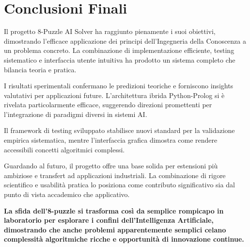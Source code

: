 \documentclass[12pt,a4paper]{report}
\theoremstyle{definition}
\begin{document}
\section{Conclusioni Finali}

Il progetto 8-Puzzle AI Solver ha raggiunto pienamente i suoi obiettivi, dimostrando l'efficace applicazione dei principi dell'Ingegneria della Conoscenza a un problema concreto. La combinazione di implementazione efficiente, testing sistematico e interfaccia utente intuitiva ha prodotto un sistema completo che bilancia teoria e pratica.

I risultati sperimentali confermano le predizioni teoriche e forniscono insights valutativi per applicazioni future. L'architettura ibrida Python-Prolog si è rivelata particolarmente efficace, suggerendo direzioni promettenti per l'integrazione di paradigmi diversi in sistemi AI.

Il framework di testing sviluppato stabilisce nuovi standard per la validazione empirica sistematica, mentre l'interfaccia grafica dimostra come rendere accessibili concetti algoritmici complessi.

Guardando al futuro, il progetto offre una base solida per estensioni più ambiziose e transfert ad applicazioni industriali. La combinazione di rigore scientifico e usabilità pratica lo posiziona come contributo significativo sia dal punto di vista accademico che applicativo.

\textbf{La sfida dell'8-puzzle si trasforma così da semplice rompicapo in laboratorio per esplorare i confini dell'Intelligenza Artificiale, dimostrando che anche problemi apparentemente semplici celano complessità algoritmiche ricche e opportunità di innovazione continue.}
\end{document}
